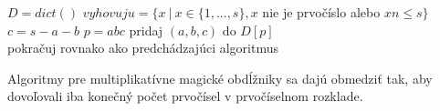 \begin{algorithmic}
\STATE $D = dict()$
\STATE $vyhovuju = \{x ~|~ x \in \{1, ... , s\}, x$ nie je prvočíslo alebo $xn \leq s\}$
	\STATE $c = s-a-b$
		\STATE $p = abc$
		\STATE pridaj $(a,b,c)$ do $D[p]$ \\
	\ENDIF
\ENDFOR
pokračuj rovnako ako predchádzajúci algoritmus
\end{algorithmic}

\begin{subnote} Algoritmy pre multiplikatívne magické obdĺžniky sa dajú obmedziť tak, aby dovoľovali iba konečný počet prvočísel v prvočíselnom rozklade.
\end{subnote} 

